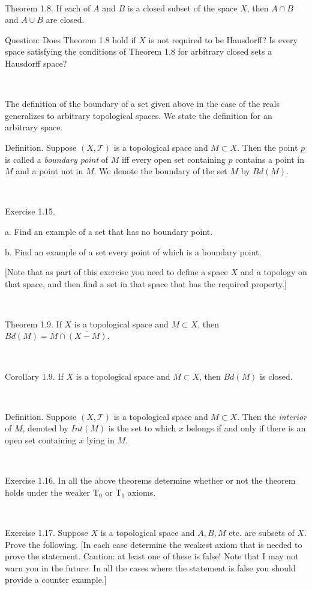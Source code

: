 \documentclass[12pt, std]{article}
\begin{document}
\

Theorem 1.8.  If each of $A$ and $B$ is a closed subset of the space
$X$, then $A \cap B$ and $A \cup B$ are closed.

Question: Does Theorem 1.8 hold if $X$ is not required to be
Hausdorff?  Is every space satisfying the conditions of Theorem 1.8
for arbitrary closed sets a Hausdorff space?

\

The definition of the boundary of a set given above in the case of
the reals generalizes to arbitrary topological spaces.  We state the
definition for an arbitrary space.



Definition.  Suppose $(X, \mathcal{T})$ is a topological space and
$M \subset X$.  Then the point $p$ is called a \textit{boundary
point} of $M$ iff every open set containing $p$ contains a point in
$M$ and a point not in $M$.  We denote the boundary of the set $M$
by $Bd (M)$.

\

Exercise 1.15.

\qquad a.  Find an example of a set that has no boundary point.

\qquad b.  Find an example of a set every point of which is a
boundary point.

[Note that as part of this exercise you need to define a space $X$
and a topology on that space, and then find a set in that space that
has the required property.]

\

Theorem 1.9.  If $X$ is a topological space and $M \subset X$, then
$Bd(M) = \overline{M} \cap \overline{(X-M)}$.

\

Corollary 1.9.  If $X$ is a topological space and $M \subset X$,
then $Bd(M)$ is closed.

\

Definition.  Suppose $(X, \mathcal{T})$ is a topological space and
$M \subset X$.  Then the \textit{interior} of $M$, denoted by
$Int(M)$ is the set to which $x$ belongs if and only if there is an
open set containing $x$ lying in $M$.

\

Exercise 1.16.  In all the above theorems determine whether or not
the theorem holds under the weaker $\textrm{T}_0$ or $\textrm{T}_1$
axioms.

\

Exercise 1.17.  Suppose $X$ is a topological space and $A, B, M$ etc. are subsets of $X$. Prove the following.  [In each case determine the weakest axiom
that is needed to prove the statement.  Caution: at least one of
these is false! Note that I may not warn you in the future. In all
the cases where the statement is false you should provide a counter
example.]
\end{document}
